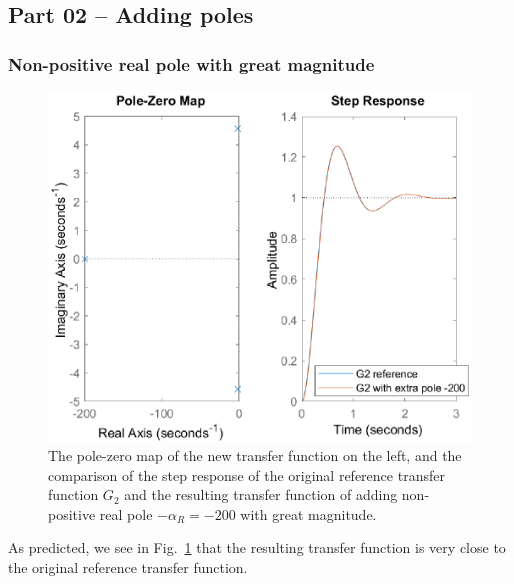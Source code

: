 \documentclass[12pt]{article}
\begin{document}
\subsection{Part 02 -- Adding poles}

\subsubsection{Non-positive real pole with great magnitude}

\begin{figure}
    \centering
    \includegraphics{img/part02_nonpositive_real_pole.eps}
    \caption{The pole-zero map of the new transfer function on the left, and the comparison of the step response of the original reference transfer function $G_2$ and the resulting transfer function of adding non-positive real pole $-\alpha_R = -200$ with great magnitude.}
    \label{fig:non-positive real poles}
\end{figure}

As predicted, we see in Fig.~\ref{fig:non-positive real poles} that the resulting transfer function is very close to the original reference transfer function.
\end{document}
